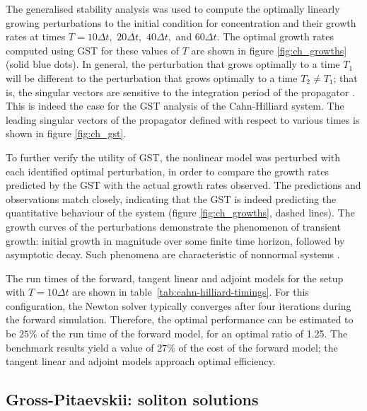 \documentclass{siamltex}
\begin{document}
The generalised stability analysis was used to compute the optimally linearly growing perturbations to the initial condition for concentration and their
growth rates at times
$T = 10\Delta t,$ $20 \Delta t,$ $40 \Delta t,$ and $60 \Delta t$. The optimal growth rates computed using GST for these values of $T$ are shown in figure \ref{fig:ch_growths}
(solid blue dots).
In general, the perturbation that grows optimally to a time $T_1$ will be different to the perturbation that grows optimally to a time $T_2 \ne T_1$; that is,
the singular vectors are sensitive to the integration period of the propagator \cite[pg. 220]{kalnay2002}. This is indeed the case for the GST analysis of the
Cahn-Hilliard system. The leading singular vectors of the propagator defined with respect to various times is shown in figure \ref{fig:ch_gst}. 

To further verify the utility of GST, the nonlinear model was perturbed with each identified optimal perturbation, in order to compare the growth rates
predicted by the GST with the actual growth rates observed. The predictions and observations match closely, indicating that the
GST is indeed predicting the quantitative behaviour of the system (figure \ref{fig:ch_growths}, dashed lines). The growth curves of the
perturbations demonstrate the phenomenon of transient growth: initial growth in magnitude over some finite time horizon, followed by
asymptotic decay. Such phenomena are characteristic of nonnormal systems \cite{trefethen2006}.

The run times of the forward, tangent linear and adjoint models for the setup with $T=10\Delta t$ are shown in table~\ref{tab:cahn-hilliard-timings}. 
For this configuration, the Newton solver typically converges after four iterations during the forward simulation. 
Therefore, the optimal performance can be estimated to be $25\%$ of the run time of the forward model, for an optimal ratio of 1.25.
The benchmark results yield a value of $27\%$ of the cost of the forward model; the tangent linear and adjoint models approach optimal efficiency.

\subsection{Gross-Pitaevskii: soliton solutions}
\end{document}
